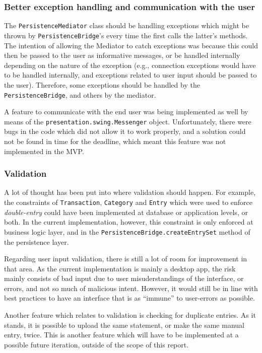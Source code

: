 \subsubsection{Better exception handling and communication with the user}
The \texttt{PersistenceMediator} class should be handling exceptions which
might be thrown by \texttt{PersistenceBridge}'s every time the first calls the
latter's methods. The intention of allowing the Mediator to catch exceptions
was because this could then be passed to the user as informative messages, or
be handled internally depending on the nature of the exception (e.g.,
connection exceptions would have to be handled internally, and exceptions
related to user input should be passed to the user). Therefore, some exceptions
should be handled by the \texttt{PersistenceBridge}, and others by the
mediator.

A feature to communicate with the end user was being implemented as well by
means of the \texttt{presentation.swing.Messenger} object. Unfortunately, there
were bugs in the code which did not allow it to work properly, and a solution
could not be found in time for the deadline, which meant this feature was not
implemented in the MVP.

\subsubsection{Validation} \label{sec:Reflections.TimeConstraints.Validation} 
A lot of thought has been put into where validation should happen. For example,
the constraints of \texttt{Transaction}, \texttt{Category} and \texttt{Entry}
which were used to enforce \emph{double-entry} could have been implemented at
database or application levels, or both. In the current implementation,
however, this constraint is only enforced at business logic layer, and in the
\texttt{PersistenceBridge.createEntrySet} method of the persistence layer.

Regarding user input validation, there is still a lot of room for improvement
in that area. As the current implementation is mainly a desktop app, the risk
mainly consists of bad input due to user misuderstandings of the interface, or
errors, and not so much of malicious intent. However, it would still be in line
with best practices to have an interface that is as ``immune'' to user-errors as
possible.

Another feature which relates to validation is checking for duplicate entries.
As it stands, it is possible to upload the same statement, or make the same
manual entry, twice. This is another feature which will have to be implemented
at a possible future iteration, outside of the scope of this report.


